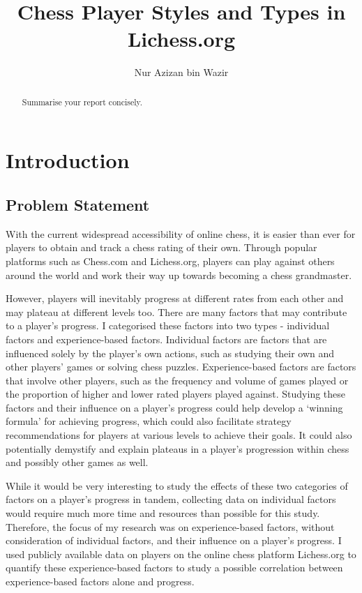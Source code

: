 \documentclass[a4paper]{article}
\title{Chess Player Styles and Types in Lichess.org}
\author{Nur Azizan bin Wazir}
\begin{document}
\maketitle
\newpage

\begin{abstract}
Summarise your report concisely.
\end{abstract}
\clearpage
\tableofcontents
\clearpage
\setcounter{page}{1}

\section{Introduction}

\subsection{Problem Statement}

With the current widespread accessibility of online chess, it is easier than ever for players to obtain and track a chess rating of their own. Through popular platforms such as Chess.com and Lichess.org, players can play against others around the world and work their way up towards becoming a chess grandmaster. 

However, players will inevitably progress at different rates from each other and may plateau at different levels too. There are many factors that may contribute to a player's progress. I categorised these factors into two types - individual factors and experience-based factors. Individual factors are factors that are influenced solely by the player's own actions, such as studying their own and other players' games or solving chess puzzles. Experience-based factors are factors that involve other players, such as the frequency and volume of games played or the proportion of higher and lower rated players played against. Studying these factors and their influence on a player's progress could help develop a `winning formula' for achieving progress, which could also facilitate strategy recommendations for players at various levels to achieve their goals. It could also potentially demystify and explain plateaus in a player's progression within chess and possibly other games as well.

While it would be very interesting to study the effects of these two categories of factors on a player's progress in tandem, collecting data on individual factors would require much more time and resources than possible for this study. Therefore, the focus of my research was on experience-based factors, without consideration of individual factors, and their influence on a player's progress. I used publicly available data on players on the online chess platform Lichess.org to quantify these experience-based factors to study a possible correlation between experience-based factors alone and progress.
\end{document}
